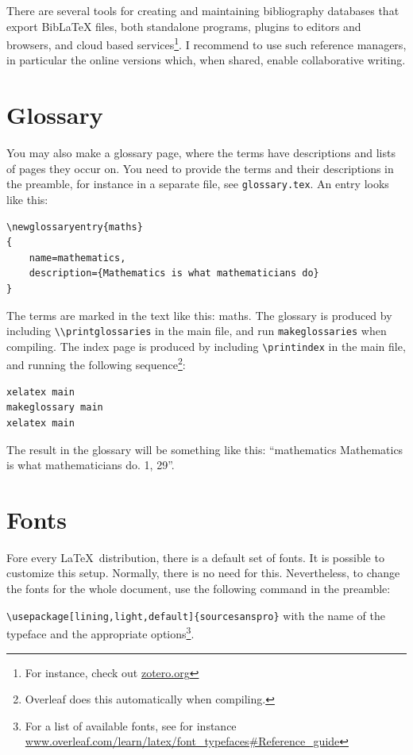 There are several tools for creating and maintaining bibliography databases that export BibLaTeX files, both standalone programs, plugins to editors and browsers, and cloud based services\footnote{For instance, check out \url{zotero.org}}. I recommend to use such reference managers, in particular the online versions which, when shared, enable collaborative writing.

\section{Glossary}

You may also make a glossary page, where the terms have descriptions and lists of pages they occur on. You need to provide the terms and their descriptions in the preamble, for instance in a separate file, see \verb|glossary.tex|. An entry looks like this:

\begin{lstlisting}[float,float=!htbp]
\newglossaryentry{maths}
{
    name=mathematics,
    description={Mathematics is what mathematicians do}
}
\end{lstlisting}

The terms are marked in the text like this:  
\gls{maths}. The glossary is produced by including \verb|\\printglossaries| in the main file, and run \verb|makeglossaries| when compiling. The index page is produced by including \verb|\printindex| in the main file, and running the following sequence\footnote{Overleaf does this automatically when compiling.}:

\begin{lstlisting}[float,float=!htbp]
xelatex main
makeglossary main
xelatex main
\end{lstlisting}

The result in the glossary will be something like this:  ``mathematics Mathematics is what mathematicians do. 1, 29''.

\section{Fonts}

Fore every  \LaTeX\ distribution, there is a default set of fonts.
It is possible to customize this  setup.
Normally, there is no need for this.
Nevertheless, to change the fonts for the whole document, use the following command in the preamble:

\verb|\usepackage[lining,light,default]{sourcesanspro}|
with the name of the typeface and the appropriate options\footnote{For a list of available fonts, see for instance \url{www.overleaf.com/learn/latex/font_typefaces\#Reference_guide}}.

